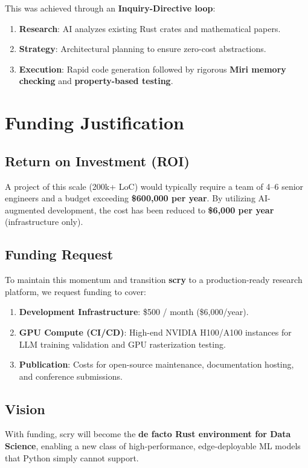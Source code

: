 \documentclass[11pt,a4paper]{article}
\begin{document}
This was achieved through an \textbf{Inquiry-Directive loop}:
\begin{enumerate}
    \item \textbf{Research}: AI analyzes existing Rust crates and mathematical papers.
    \item \textbf{Strategy}: Architectural planning to ensure zero-cost abstractions.
    \item \textbf{Execution}: Rapid code generation followed by rigorous \textbf{Miri memory checking} and \textbf{property-based testing}.
\end{enumerate}

\section{Funding Justification}

\subsection{Return on Investment (ROI)}
A project of this scale (200k+ LoC) would typically require a team of 4--6 senior engineers and a budget exceeding \textbf{\$600,000 per year}. By utilizing AI-augmented development, the cost has been reduced to \textbf{\$6,000 per year} (infrastructure only).

\subsection{Funding Request}
To maintain this momentum and transition \textbf{scry} to a production-ready research platform, we request funding to cover:
\begin{enumerate}
    \item \textbf{Development Infrastructure}: \$500 / month (\$6,000/year).
    \item \textbf{GPU Compute (CI/CD)}: High-end NVIDIA H100/A100 instances for LLM training validation and GPU rasterization testing.
    \item \textbf{Publication}: Costs for open-source maintenance, documentation hosting, and conference submissions.
\end{enumerate}

\subsection{Vision}
With funding, scry will become the \textbf{de facto Rust environment for Data Science}, enabling a new class of high-performance, edge-deployable ML models that Python simply cannot support.
\end{document}
